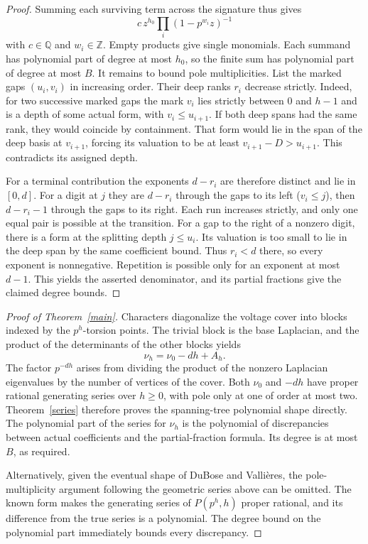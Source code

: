 \documentclass[11pt]{article}
\newcommand{\Z}{\mathbb Z}
\newcommand{\Q}{\mathbb Q}
\begin{document}
\begin{proof}
Summing each surviving term across the signature thus gives
\[
c\,z^{h_0}\prod_i(1-p^{w_i}z)^{-1}
\]
with $c\in\Q$ and $w_i\in\Z$. Empty products give single monomials. Each summand has polynomial part of degree at most $h_0$, so the finite sum has polynomial part of degree at most $B$. It remains to bound pole multiplicities. List the marked gaps $(u_i,v_i)$ in increasing order. Their deep ranks $r_i$ decrease strictly. Indeed, for two successive marked gaps the mark $v_i$ lies strictly between $0$ and $h-1$ and is a depth of some actual form, with $v_i\le u_{i+1}$. If both deep spans had the same rank, they would coincide by containment. That form would lie in the span of the deep basis at $v_{i+1}$, forcing its valuation to be at least $v_{i+1}-D>u_{i+1}$. This contradicts its assigned depth.

For a terminal contribution the exponents $d-r_i$ are therefore distinct and lie in $[0,d]$. For a digit at $j$ they are $d-r_i$ through the gaps to its left ($v_i\le j$), then $d-r_i-1$ through the gaps to its right. Each run increases strictly, and only one equal pair is possible at the transition. For a gap to the right of a nonzero digit, there is a form at the splitting depth $j\le u_i$. Its valuation is too small to lie in the deep span by the same coefficient bound. Thus $r_i<d$ there, so every exponent is nonnegative. Repetition is possible only for an exponent at most $d-1$. This yields the asserted denominator, and its partial fractions give the claimed degree bounds.
\end{proof}

\begin{proof}[Proof of Theorem~\ref{main}]
Characters diagonalize the voltage cover into blocks indexed by the $p^h$-torsion points. The trivial block is the base Laplacian, and the product of the determinants of the other blocks yields
\[
\nu_h=\nu_0-dh+A_h .
\]
The factor $p^{-dh}$ arises from dividing the product of the nonzero Laplacian eigenvalues by the number of vertices of the cover. Both $\nu_0$ and $-dh$ have proper rational generating series over $h\ge0$, with pole only at one of order at most two. Theorem~\ref{series} therefore proves the spanning-tree polynomial shape directly. The polynomial part of the series for $\nu_h$ is the polynomial of discrepancies between actual coefficients and the partial-fraction formula. Its degree is at most $B$, as required.

Alternatively, given the eventual shape of DuBose and Vallières, the pole-multiplicity argument following the geometric series above can be omitted. The known form makes the generating series of $P(p^h,h)$ proper rational, and its difference from the true series is a polynomial. The degree bound on the polynomial part immediately bounds every discrepancy.
\end{proof}
\end{document}
